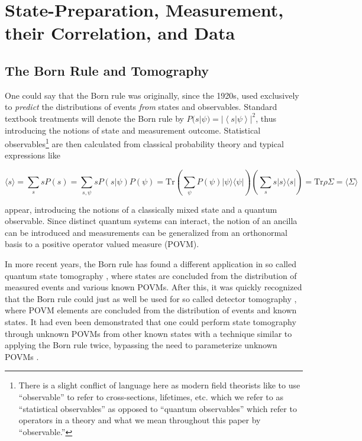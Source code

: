 \documentclass[pra, 10pt, notitlepage, twocolumn]{revtex4-1}
\newcommand{\braket}[2]{\left\langle #1 | #2 \right\rangle}
\newcommand{\proj}[1]{| #1\rangle\!\langle #1 |}
\newcommand{\Tr}{\mathrm{Tr}}
\begin{document}
\section{State-Preparation, Measurement, their Correlation, and Data}




\subsection{The Born Rule and Tomography}

One could say that the Born rule was originally, since the 1920s, used exclusively to \emph{predict} the distributions of events \emph{from} states and observables.
Standard textbook treatments will denote the Born rule by $P(s|\psi) = |\braket{s}{\psi}|^2$, thus introducing the notions of state and measurement outcome.
Statistical observables\footnote{
There is a slight conflict of language here as modern field theorists like to use ``observable'' to refer to cross-sections, lifetimes, etc. which we refer to as ``statistical observables'' as opposed to ``quantum observables'' which refer to operators in a theory and what we mean throughout this paper by ``observable.''}
are then calculated from classical probability theory and typical expressions like
\begin{widetext}

\begin{equation}\label{typical}
\langle s \rangle = \sum_s s P(s) = \sum_{s,\psi} s P(s|\psi)P(\psi) = \Tr\left(\sum_{\psi} P(\psi)\proj{\psi}\right)\left(\sum_{s} s \proj{s}\right)= \Tr\rho\Sigma = \langle\Sigma\rangle
\end{equation}

\end{widetext}
appear, introducing the notions of a classically mixed state and a quantum observable.
Since distinct quantum systems can interact, the notion of an ancilla can be introduced and measurements can be generalized from an orthonormal basis to a positive operator valued measure (POVM).


In more recent years, the Born rule has found a different application in so called quantum state tomography \cite{raymer, paris}, where states are concluded from the distribution of measured events and various known POVMs.
After this, it was quickly recognized that the Born rule could just as well be used for so called detector tomography \cite{lundeen, feito}, where POVM elements are concluded from the distribution of events and known states.
It had even been demonstrated that one could perform state tomography through unknown POVMs from other known states with a technique similar to applying the Born rule twice, bypassing the need to parameterize unknown POVMs \cite{cooper2014local}.
\end{document}

